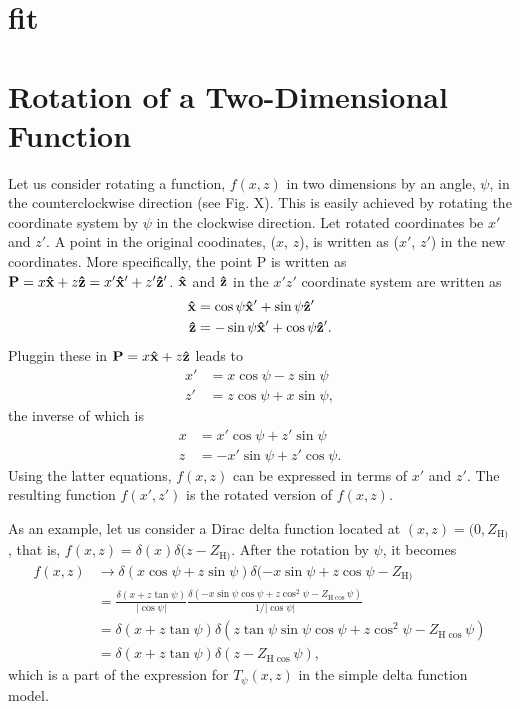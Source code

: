 \documentclass[12pt,letterpaper]{article}
\newcommand{\zh}[1]{Z_{\mathrm{H}#1}}
\begin{document}
\section{fit}

\appendix
\section{Rotation of a Two-Dimensional Function}
Let us consider rotating a function, $f(x,z)$ in two dimensions by an angle, 
$\psi$, in the counterclockwise direction (see Fig. X). This is easily 
achieved by rotating the coordinate system by $\psi$ in the clockwise direction. 
Let rotated coordinates be $x'$ and $z'$. A point in the original coodinates,
($x$, $z$), is written as ($x'$, $z'$) in the new coordinates. More specifically,
the point P is written as 
$\mathbf{P}=x\mathbf{\hat{x}}+z\mathbf{\hat{z}}=x'\mathbf{\hat{x}}'+z'\mathbf{\hat{z}}'$. $\mathbf{\hat{x}}$ and $\mathbf{\hat{z}}$ in
the $x'z'$ coordinate system are written as 
\begin{align}
  \mathbf{\hat{x}} &= \cos\psi\mathbf{\hat{x}}'+\sin\psi\mathbf{\hat{z}}' \\
  \mathbf{\hat{z}} &= -\sin\psi\mathbf{\hat{x}}'+\cos\psi\mathbf{\hat{z}}'.
\end{align}
Pluggin these in $\mathbf{P}=x\mathbf{\hat{x}}+z\mathbf{\hat{z}}$ leads to
\begin{align}
  x' &= x\cos\psi - z\sin\psi \\
  z' &= z\cos\psi + x\sin\psi,
\end{align}
the inverse of which is
\begin{align}
  x &= x'\cos\psi + z'\sin\psi \\
  z &= -x'\sin\psi + z'\cos\psi.
\end{align}
Using the latter equations, $f(x,z)$ can be expressed in terms of $x'$ and $z'$. 
The resulting function $f(x',z')$ is the rotated version of $f(x,z)$. 

As an 
example, let us consider a Dirac delta function located at $(x,z)=(0,\zh)$,
that is, $f(x,z)=\delta(x)\delta(z-\zh)$. After the rotation by $\psi$, it 
becomes
\begin{align*}
  f(x,z) 
  &\rightarrow 
    \delta(x\cos\psi+z\sin\psi) \delta(-x\sin\psi+z\cos\psi-\zh) \\
  &= \frac{\delta(x+z\tan\psi)}{|\cos\psi|}
     \frac{\delta(-x\sin\psi\cos\psi+z\cos^2\psi-\zh\cos\psi)}{1/|\cos\psi|} \\
  &= \delta(x+z\tan\psi)\delta(z\tan\psi\sin\psi\cos\psi+z\cos^2\psi-\zh\cos\psi) \\
  &= \delta(x+z\tan\psi)\delta(z-\zh\cos\psi),
\end{align*}
which is a part of the expression for $T_\psi(x,z)$ in the simple delta 
function model.
\end{document}
